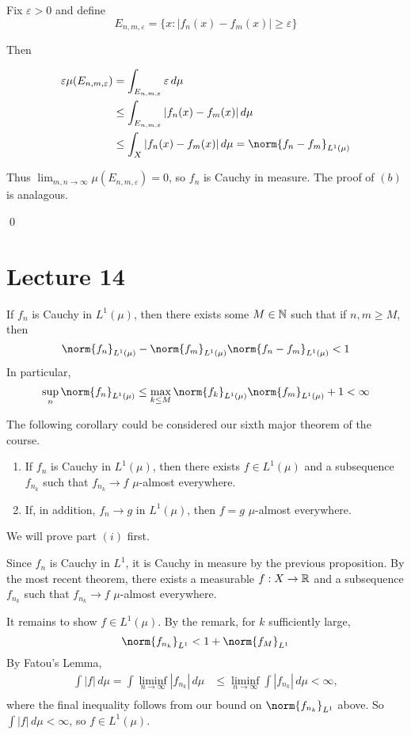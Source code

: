\documentclass[x11names,reqno,14pt]{extarticle}
\newcommand*{\oo}{\infty}
\begin{document}
\proof

Fix $\varepsilon>0$ and define 
\[
E_{n,m, \varepsilon} = \{x:|f_n(x) - f_m(x)| \geq \varepsilon\}
\]

Then 

\begin{align*}
\varepsilon\mu(E_{n, m, \varepsilon})& = \int_{E_{n, m, \varepsilon}}\varepsilon\,d\mu \\ & \leq \int_{E_{n, m, \varepsilon}}|f_n(x) - f_m(x)|\,d\mu \\ 
& \leq \int_X|f_n(x) - f_m(x)|\,d\mu = \norm{f_n - f_m}_{L^1(\mu)}
\end{align*}

Thus $\lim_{m,n\to\oo}\mu(E_{n, m, \varepsilon}) = 0$, so $f_n$ is Cauchy in measure. The proof of $(b)$ is analagous. 

\qed

\section*{Lecture 14}

\rem

If $f_n$ is Cauchy in $L^1(\mu)$, then there exists some $M \in \mathbb{N}$ such that if $n, m \geq M$, then
\[
\norm{f_n}_{L^1(\mu)} - \norm{f_m}_{L^1(\mu)}\norm{f_n - f_m}_{L^1(\mu)} < 1
\]
In particular, 
\[
\sup_n\norm{f_n}_{L^1(\mu)} \leq \max_{k\leq M}\norm{f_k}_{L^1(\mu)}\norm{f_m}_{L^1(\mu)} + 1 < \oo
\]

The following corollary could be considered our sixth major theorem of the course. 

\cor
\begin{enumerate}[label=(\roman*)]
\item If $f_n$ is Cauchy in $L^1(\mu)$, then there exists $f\in L^1(\mu)$ and a subsequence $f_{n_k}$ such that $f_{n_k}\to f$ $\mu$-almost everywhere. 
\item If, in addition, $f_n\to g$ in $L^1(\mu)$, then $f = g$ $\mu$-almost everywhere. 
\end{enumerate}

\proof

We will prove part $(i)$ first. 

Since $f_n$ is Cauchy in $L^1$, it is Cauchy in measure by the previous proposition. By the most recent theorem, there exists a measurable $f:X\to \mathbb{R}$ and a subsequence $f_{n_k}$ such that $f_{n_k}\to f$ $\mu$-almost everywhere. 

It remains to show $f \in L^1(\mu)$. By the remark, for $k$ sufficiently large, 
\[
\norm{f_{n_k}}_{L^1} < 1 + \norm{f_M}_{L^1}
\]
By Fatou's Lemma, 
\begin{align*}
\int |f|\,d\mu = \int\liminf_{n\to\oo}|f_{n_k}|\,d\mu & \leq \liminf_{n\to\oo}\int|f_{n_k}|\,d\mu < \oo, \\
\end{align*}
where the final inequality follows from our bound on $\norm{f_{n_k}}_{L^1}$ above. So $\int|f|\,d\mu < \oo$, so $f \in L^1(\mu)$. 
\end{document}
